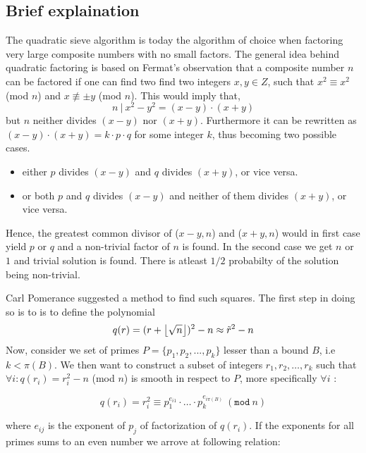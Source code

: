 \subsection{Brief explaination}
The quadratic sieve algorithm is today the algorithm of choice when factoring very large composite numbers
with no small factors. The general idea behind quadratic factoring is based on Fermat's observation that
a composite number $n$ can be factored if one can find two find two integers $x,y \in Z$, such
that $x^2 \equiv x^2$ (mod $n$) and $x \not\equiv \pm y$ (mod $n$). This would imply that,
\begin{equation}
n \ | \ x^2-y^2 = (x-y) \cdot (x+y)
\end{equation}
but $n$ neither divides $(x-y)$ nor $(x+y)$. 
Furthermore it can be rewritten as $(x-y) \cdot (x+y) = k \cdot p \cdot q$ for some integer $k$, thus becoming two possible cases.

\begin{itemize}
	\item either $p$ divides $(x-y)$ and $q$ divides $(x+y)$, or vice versa.
	\item or both $p$ and $q$ divides $(x-y)$ and neither of them divides $(x+y)$, or vice versa.
\end{itemize}

Hence, the greatest common divisor of ($x-y,n$) and ($x+y,n$) would in first case yield $p$ or $q$ and a non-trivial factor of 
$n$ is found. In the second case we get $n$ or $1$ and trivial solution is found. There is atleast $1/2$ probabilty of 
the solution being non-trivial\cite{Pomerance1985}.

Carl Pomerance suggested a method to find such squares\cite{Pomerance1985}. The first step in doing so is to is to define the polynomial 
\begin{equation}
q(r) = (r + \left \lfloor \sqrt{n} \right \rfloor)^2-n \approx \tilde{r}^2-n
\end{equation}
Now, consider we set of primes $P = \{ p_1, p_2, ..., p_k \}$ lesser than a bound $B$, i.e $k < \pi(B)$. We then want to construct a subset of integers  $r_1, r_2, \ldots, r_k$ such that $\forall i : q(r_i) = r_i^2-n$ (mod $n$) is smooth in respect to $P$, more specifically $\forall i$ :

\begin{equation}
 q(r_i) = r_i^2 \equiv p_1^{e_{i1}} \cdot \ldots \cdot p_k^{e_{i\pi(B)}} \ (\texttt{mod} \ n)
\end{equation}

where $e_{ij}$ is the exponent of $p_j$ of factorization of $q(r_i)$. If the exponents for all primes sums to
an even number we arrove at following relation:

